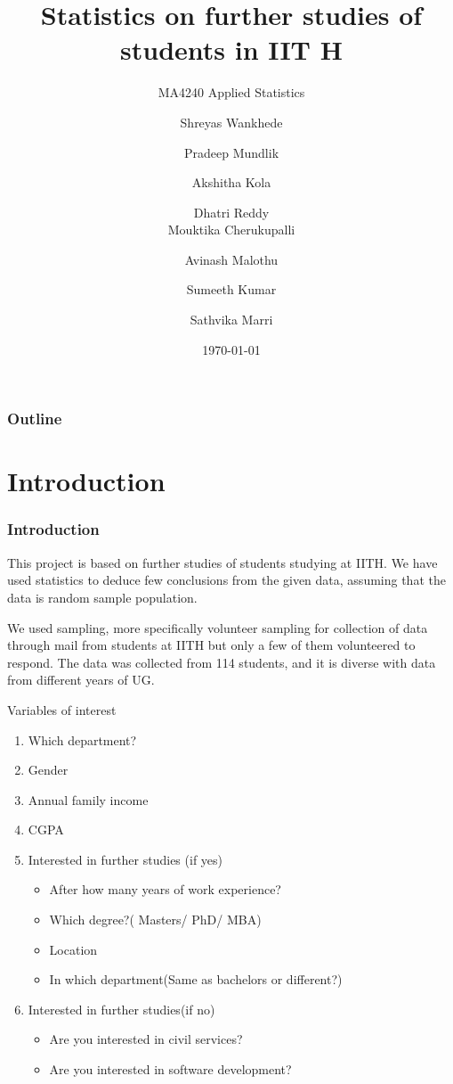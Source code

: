 \documentclass{beamer}
\title{Statistics on further studies of students in IIT H}
\subtitle{MA4240  Applied Statistics}
\author{\footnotesize Shreyas Wankhede \and Pradeep Mundlik \and Akshitha Kola\and Dhatri Reddy\\ Mouktika Cherukupalli \and Avinash Malothu\and Sumeeth Kumar\and Sathvika Marri}
\institute{\large Indian Institute of Technology Hyderabad}
\date{\today}
\begin{document}
\begin{frame}
  \titlepage
\end{frame}

\begin{frame}
  \frametitle{Outline}
  \tableofcontents
\end{frame}

\section{Introduction}
\begin{frame}
  \frametitle{Introduction}
  \begin{block}{}  
  This project is based on further studies of students studying at IITH. We have used statistics to deduce few conclusions from the given data, assuming that the data is random sample population.  
  \end{block}

  \begin{block}{}  
  We used sampling, more specifically volunteer sampling for collection of data through mail from students at IITH but only a few of them volunteered to respond. The data was collected from 114 students, and it is diverse with data from different years of UG.
  \end{block}

\end{frame}

\begin{frame}
  \begin{block}{Variables of interest}
      \begin{enumerate}
          \item Which department?
          \item Gender
          \item Annual family income
          \item CGPA
          \item Interested in further studies (if yes) 
          \begin{itemize}
              \item After how many years of work experience?
              \item Which degree?( Masters/ PhD/ MBA)
              \item Location
              \item In which department(Same as bachelors or different?)
          \end{itemize}
          \item Interested in further studies(if no)
          \begin{itemize}
              \item Are you interested in civil services?
              \item Are you interested in software development?
          \end{itemize}
      \end{enumerate}
  \end{block}  
\end{frame}
\end{document}
